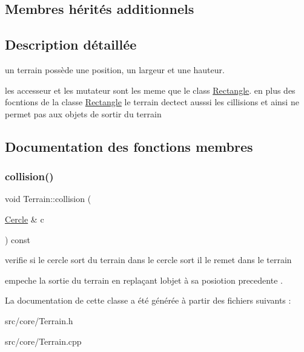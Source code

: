 \subsection*{Membres hérités additionnels}


\subsection{Description détaillée}
un terrain possède une position, un largeur et une hauteur. 

les accesseur et les mutateur sont les meme que le class \mbox{\hyperlink{class_rectangle}{Rectangle}}. en plus des focntions de la classe \mbox{\hyperlink{class_rectangle}{Rectangle}} le terrain dectect ausssi les cillisions et ainsi ne permet pas aux objets de sortir du terrain 

\subsection{Documentation des fonctions membres}
\mbox{\label{class_terrain_a9546059cb210f4e4f90905ba9d0f23ea}} 
\subsubsection{\texorpdfstring{collision()}{collision()}}
{\footnotesize\ttfamily void Terrain\+::collision (\begin{DoxyParamCaption}\item[{\mbox{\hyperlink{class_cercle}{Cercle}} \&}]{c }\end{DoxyParamCaption}) const}



verifie si le cercle sort du terrain dans le cercle sort il le remet dans le terrain 

empeche la sortie du terrain en replaçant l\textquotesingle{}objet à sa posiotion precedente . 

La documentation de cette classe a été générée à partir des fichiers suivants \+:\begin{DoxyCompactItemize}
\item 
src/core/Terrain.\+h\item 
src/core/Terrain.\+cpp\end{DoxyCompactItemize}
